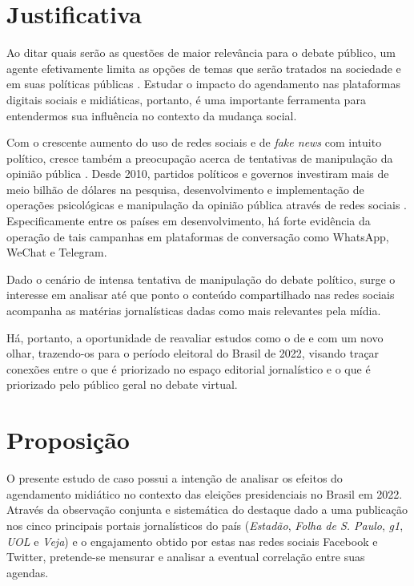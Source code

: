 \documentclass[
	12pt,
	oneside,
	a4paper,
	english,
	brazil
]{abntex2ppgsi}
\begin{document}
\section{Justificativa}
Ao ditar quais serão as questões de maior relevância para o debate público, um agente efetivamente limita as opções de temas que serão tratados na sociedade e em suas políticas públicas \cite{mccombs}. Estudar o impacto do agendamento nas plataformas digitais sociais e midiáticas, portanto, é uma importante ferramenta para entendermos sua influência no contexto da mudança social.

Com o crescente aumento do uso de redes sociais e de \textit{fake news} com intuito político, cresce também a preocupação acerca de tentativas de manipulação da opinião pública \cite{zhuravskaya}. Desde 2010, partidos políticos e governos investiram mais de meio bilhão de dólares na pesquisa, desenvolvimento e implementação de operações psicológicas e manipulação da opinião pública através de redes sociais \cite{bradshaw}. Especificamente entre os países em desenvolvimento, há forte evidência da operação de tais campanhas em plataformas de conversação como WhatsApp, WeChat e Telegram.

Dado o cenário de intensa tentativa de manipulação do debate político, surge o interesse em analisar até que ponto o conteúdo compartilhado nas redes sociais acompanha as matérias jornalísticas dadas como mais relevantes pela mídia. 

Há, portanto, a oportunidade de reavaliar estudos como o de  e  com um novo olhar, trazendo-os para o período eleitoral do Brasil de 2022, visando traçar conexões entre o que é priorizado no espaço editorial jornalístico e o que é priorizado pelo público geral no debate virtual.


\section{Proposição}
O presente estudo de caso possui a intenção de analisar os efeitos do agendamento midiático no contexto das eleições presidenciais no Brasil em 2022. Através da observação conjunta e sistemática do destaque dado a uma publicação nos cinco principais portais jornalísticos do país (\textit{Estadão}, \textit{Folha de S. Paulo}, \textit{g1}, \textit{UOL} e \textit{Veja}) e o engajamento obtido por estas nas redes sociais Facebook e Twitter, pretende-se mensurar e analisar a eventual correlação entre suas agendas.
\end{document}
